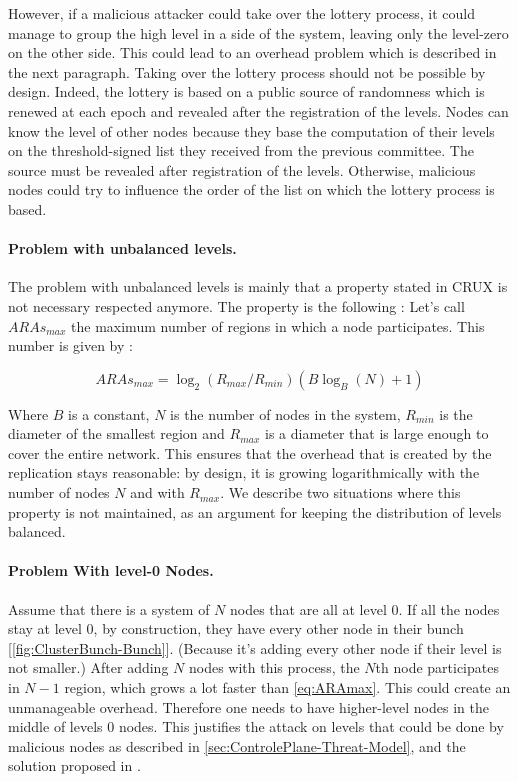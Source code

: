 \documentclass[a4paper,11pt,twoside,openright]{report}
\begin{document}
However, if a malicious attacker could take over the lottery process, it could
manage to group the high level in a side of the system, leaving only the
level-zero on the other side. This could lead to an overhead problem which is described in the next paragraph.
Taking over the lottery process should not be possible by design. Indeed, the
lottery is based on a public source of randomness which is renewed at each epoch
and revealed after the registration of the levels. Nodes can know the level of
other nodes because they base the computation of their levels on the
threshold-signed list they received from the previous committee. The source
must be revealed after registration of the levels. Otherwise, malicious nodes
could try to influence the order of the list on which the lottery process is
based. 

\paragraph{Problem with unbalanced levels.} \label{app:unbalanced-levels}
The problem with unbalanced levels is mainly that a property stated in CRUX
\cite{Basescu2014} is not necessary respected anymore. The property is the
following : Let's call $ARAs_{max}$ the maximum number of regions in which a
node participates. This number is given by : 

\begin{equation} \label{eq:ARAmax}
ARAs_{max} = \log_2(R_{max}/R_{min}) (B \log_B(N)+1)
\end{equation}

Where $B$ is a constant, $N$ is the number of nodes in the system, $R_{min}$ is
the diameter of the smallest region and $R_{max}$ is a diameter that is large
enough to cover the entire network. This ensures that the overhead that is
created by the replication stays reasonable: by design, it is growing
logarithmically with the number of nodes $N$ and with $R_{max}$. We describe two situations where this property is not maintained, as an argument
for keeping the distribution of levels balanced.

\paragraph{Problem With level-0 Nodes.} \label{app:levels-zero}
Assume that there is a system of $N$ nodes that are all at level 0. If all
the nodes stay at level 0, by construction, they have every other node in
their bunch [\autoref{fig:ClusterBunch-Bunch}]. (Because it’s adding every other node if their level is not smaller.) After adding $N$ nodes with this
process, the $N$th node participates in $N-1$ region, which grows a lot
faster than \autoref{eq:ARAmax}. This could create an unmanageable overhead.
Therefore one needs to have higher-level nodes in the middle of levels 0 nodes.
This justifies the attack on levels that could be done by malicious nodes as
described in \autoref{sec:ControlePlane-Threat-Model}, and the solution
proposed in .
\end{document}
